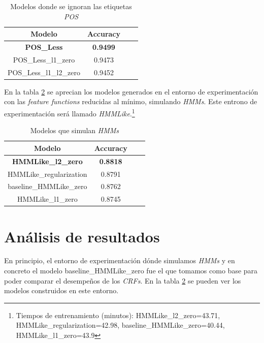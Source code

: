 \documentclass[letterpaper,12pt,oneside]{book}
\theoremstyle{definition}
\begin{document}
\begin{table}[ht]
    \centering
    \begin{tabular}{| c | c | c | c |}\hline
    \textbf{Modelo} & \textbf{Accuracy}\\\hline
    \textbf{\textsf{POS\_Less}} & \textbf{0.9499}\\
    \textsf{POS\_Less\_l1\_zero} & 0.9473\\
    \textsf{POS\_Less\_l1\_l2\_zero} & 0.9452\\\hline
    \end{tabular}
    \caption{Modelos donde se ignoran las etiquetas \textit{POS}}
    \label{tab:models-pos-less}
\end{table}

En la tabla \ref{tab:models-hmmlike} se aprecian los modelos generados en el entorno de experimentación con las \textit{feature functions} reducidas al mínimo, simulando \textit{HMMs}. Este entrono de experimentación será llamado \textit{HMMLike}.\footnote{Tiempos de entrenamiento (minutos): HMMLike\_l2\_zero=43.71, HMMLike\_regularization=42.98, baseline\_HMMLike\_zero=40.44, HMMLike\_l1\_zero=43.9 }

\begin{table}[ht]
    \centering
    \begin{tabular}{| c | c | c | c |}\hline
    \textbf{Modelo} & \textbf{Accuracy}\\\hline
    \textbf{\textsf{HMMLike\_l2\_zero}} & \textbf{0.8818}\\
    \textsf{HMMLike\_regularization} & 0.8791\\
    \textsf{baseline\_HMMLike\_zero} & 0.8762\\
    \textsf{HMMLike\_l1\_zero} & 0.8745\\\hline
    \end{tabular}
    \caption{Modelos que simulan \textit{HMMs}}
    \label{tab:models-hmmlike}
\end{table}

\section{Análisis de resultados}

En principio, el entorno de experimentación dónde simulamos \textit{HMMs} y en concreto el modelo \textsf{baseline\_HMMLike\_zero} fue el que tomamos como base para poder comparar el desempeños de los \textit{CRFs}. En la tabla \ref{tab:models-hmmlike} se pueden ver los modelos construidos en este entorno.
\end{document}
